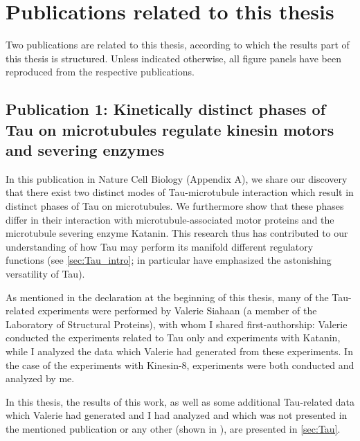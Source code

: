 \chapter{Publications related to this thesis}
\label{chap:publications}
Two publications are related to this thesis, according to which the results part of this thesis is structured. Unless indicated otherwise, all figure panels have been reproduced from the respective publications.

\section{Publication 1: Kinetically distinct phases of Tau on microtubules regulate kinesin motors and severing enzymes}
In this publication in Nature Cell Biology \parencite{Siahaan2019a} (Appendix A), we share our discovery that there exist two distinct modes of Tau-microtubule interaction which result in distinct phases of Tau on microtubules. We furthermore show that these phases differ in their interaction with microtubule-associated motor proteins and the microtubule severing enzyme Katanin. This research thus has contributed to our understanding of how Tau may perform its manifold different regulatory functions (see \autoref{sec:Tau_intro}; \cite{Morris2011b} in particular have emphasized the astonishing versatility of Tau). \par

As mentioned in the declaration at the beginning of this thesis, many of the Tau-related experiments were performed by Valerie Siahaan (a member of the Laboratory of Structural Proteins), with whom I shared first-authorship: Valerie conducted the experiments related to Tau only and experiments with Katanin, while I analyzed the data which Valerie had generated from these experiments. In the case of the experiments with Kinesin-8, experiments were both conducted and analyzed by me. \par

In this thesis, the results of this work, as well as some additional Tau-related data which Valerie had generated and I had analyzed and which was not presented in the mentioned publication or any other (shown in ), are presented in \autoref{sec:Tau}. 


